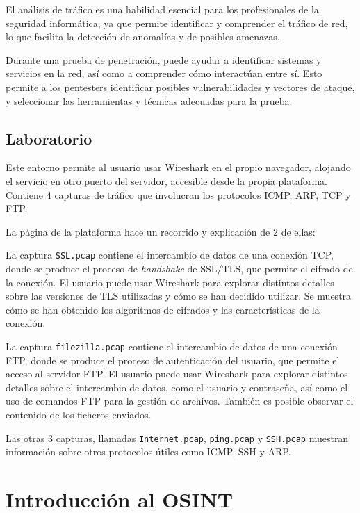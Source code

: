             El análisis de tráfico es una habilidad esencial para los profesionales de la seguridad informática, ya que permite identificar y comprender el tráfico de red, lo que facilita la detección de anomalías y de posibles amenazas.

            Durante una prueba de penetración, puede ayudar a identificar sistemas y servicios en la red, así como a comprender cómo interactúan entre sí. Esto permite a los pentesters identificar posibles vulnerabilidades y vectores de ataque, y seleccionar las herramientas y técnicas adecuadas para la prueba.

        \subsection{Laboratorio}

            Este entorno permite al usuario usar Wireshark en el propio navegador, alojando el servicio en otro puerto del servidor, accesible desde la propia plataforma. Contiene 4 capturas de tráfico que involucran los protocolos ICMP, ARP, TCP y FTP.
            
            La página de la plataforma hace un recorrido y explicación de 2 de ellas:

            La captura \texttt{SSL.pcap} contiene el intercambio de datos de una conexión TCP, donde se produce el proceso de \textit{handshake} de SSL/TLS, que permite el cifrado de la conexión. El usuario puede usar Wireshark para explorar distintos detalles sobre las versiones de TLS utilizadas y cómo se han decidido utilizar. Se muestra cómo se han obtenido los algoritmos de cifrados y las características de la conexión.

            La captura \texttt{filezilla.pcap} contiene el intercambio de datos de una conexión FTP, donde se produce el proceso de autenticación del usuario, que permite el acceso al servidor FTP. El usuario puede usar Wireshark para explorar distintos detalles sobre el intercambio de datos, como el usuario y contraseña, así como el uso de comandos FTP para la gestión de archivos. También es posible observar el contenido de los ficheros enviados.

            Las otras 3 capturas, llamadas \texttt{Internet.pcap}, \texttt{ping.pcap} y \texttt{SSH.pcap} muestran información sobre otros protocolos útiles como ICMP, SSH y ARP.


    \section{Introducción al OSINT}
        \label{sec:osint}

